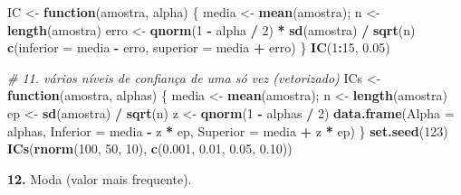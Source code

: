 \documentclass[
  portuguese,
  11pt,
  openany]{book}
\newenvironment{Shaded}{\begin{snugshade}}{\end{snugshade}}
\newcommand{\AttributeTok}[1]{\textcolor[rgb]{0.13,0.29,0.53}{#1}}
\newcommand{\CommentTok}[1]{\textcolor[rgb]{0.56,0.35,0.01}{\textit{#1}}}
\newcommand{\ControlFlowTok}[1]{\textcolor[rgb]{0.13,0.29,0.53}{\textbf{#1}}}
\newcommand{\DecValTok}[1]{\textcolor[rgb]{0.00,0.00,0.81}{#1}}
\newcommand{\FloatTok}[1]{\textcolor[rgb]{0.00,0.00,0.81}{#1}}
\newcommand{\FunctionTok}[1]{\textcolor[rgb]{0.13,0.29,0.53}{\textbf{#1}}}
\newcommand{\NormalTok}[1]{#1}
\newcommand{\OtherTok}[1]{\textcolor[rgb]{0.56,0.35,0.01}{#1}}
\newcommand{\SpecialCharTok}[1]{\textcolor[rgb]{0.81,0.36,0.00}{\textbf{#1}}}
\begin{document}
\begin{Shaded}
\begin{Highlighting}[]
\NormalTok{IC }\OtherTok{\textless{}{-}} \ControlFlowTok{function}\NormalTok{(amostra, alpha) \{}
\NormalTok{  media }\OtherTok{\textless{}{-}} \FunctionTok{mean}\NormalTok{(amostra); n }\OtherTok{\textless{}{-}} \FunctionTok{length}\NormalTok{(amostra)}
\NormalTok{  erro  }\OtherTok{\textless{}{-}} \FunctionTok{qnorm}\NormalTok{(}\DecValTok{1} \SpecialCharTok{{-}}\NormalTok{ alpha }\SpecialCharTok{/} \DecValTok{2}\NormalTok{) }\SpecialCharTok{*} \FunctionTok{sd}\NormalTok{(amostra) }\SpecialCharTok{/} \FunctionTok{sqrt}\NormalTok{(n)}
  \FunctionTok{c}\NormalTok{(}\AttributeTok{inferior =}\NormalTok{ media }\SpecialCharTok{{-}}\NormalTok{ erro, }\AttributeTok{superior =}\NormalTok{ media }\SpecialCharTok{+}\NormalTok{ erro)}
\NormalTok{\}}
\FunctionTok{IC}\NormalTok{(}\DecValTok{1}\SpecialCharTok{:}\DecValTok{15}\NormalTok{, }\FloatTok{0.05}\NormalTok{)}

\CommentTok{\# 11. vários níveis de confiança de uma só vez (vetorizado)}
\NormalTok{ICs }\OtherTok{\textless{}{-}} \ControlFlowTok{function}\NormalTok{(amostra, alphas) \{}
\NormalTok{  media }\OtherTok{\textless{}{-}} \FunctionTok{mean}\NormalTok{(amostra); n }\OtherTok{\textless{}{-}} \FunctionTok{length}\NormalTok{(amostra)}
\NormalTok{  ep }\OtherTok{\textless{}{-}} \FunctionTok{sd}\NormalTok{(amostra) }\SpecialCharTok{/} \FunctionTok{sqrt}\NormalTok{(n)}
\NormalTok{  z  }\OtherTok{\textless{}{-}} \FunctionTok{qnorm}\NormalTok{(}\DecValTok{1} \SpecialCharTok{{-}}\NormalTok{ alphas }\SpecialCharTok{/} \DecValTok{2}\NormalTok{)}
  \FunctionTok{data.frame}\NormalTok{(}\AttributeTok{Alpha =}\NormalTok{ alphas,}
             \AttributeTok{Inferior =}\NormalTok{ media }\SpecialCharTok{{-}}\NormalTok{ z }\SpecialCharTok{*}\NormalTok{ ep,}
             \AttributeTok{Superior =}\NormalTok{ media }\SpecialCharTok{+}\NormalTok{ z }\SpecialCharTok{*}\NormalTok{ ep)}
\NormalTok{\}}
\FunctionTok{set.seed}\NormalTok{(}\DecValTok{123}\NormalTok{)}
\FunctionTok{ICs}\NormalTok{(}\FunctionTok{rnorm}\NormalTok{(}\DecValTok{100}\NormalTok{, }\DecValTok{50}\NormalTok{, }\DecValTok{10}\NormalTok{), }\FunctionTok{c}\NormalTok{(}\FloatTok{0.001}\NormalTok{, }\FloatTok{0.01}\NormalTok{, }\FloatTok{0.05}\NormalTok{, }\FloatTok{0.10}\NormalTok{))}
\end{Highlighting}
\end{Shaded}

\textbf{12.} Moda (valor mais frequente).
\end{document}
